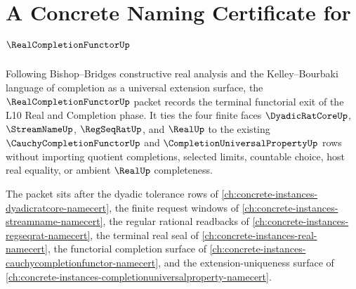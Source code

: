 \chapter{A Concrete Naming Certificate for $\RealCompletionFunctorUp$}
\label{ch:concrete-instances-real-completion-functor-namecert}

Following Bishop--Bridges constructive real analysis and the Kelley--Bourbaki language of completion as a universal extension surface, the $\RealCompletionFunctorUp$ packet records the terminal functorial exit of the L10 Real and Completion phase. It ties the four finite faces $\DyadicRatCoreUp$, $\StreamNameUp$, $\RegSeqRatUp$, and $\RealUp$ to the existing $\CauchyCompletionFunctorUp$ and $\CompletionUniversalPropertyUp$ rows without importing quotient completions, selected limits, countable choice, host real equality, or ambient $\RealUp$ completeness.

The packet sits after the dyadic tolerance rows of \autoref{ch:concrete-instances-dyadicratcore-namecert}, the finite request windows of \autoref{ch:concrete-instances-streamname-namecert}, the regular rational readbacks of \autoref{ch:concrete-instances-regseqrat-namecert}, the terminal real seal of \autoref{ch:concrete-instances-real-namecert}, the functorial completion surface of \autoref{ch:concrete-instances-cauchycompletionfunctor-namecert}, and the extension-uniqueness surface of \autoref{ch:concrete-instances-completionuniversalproperty-namecert}.

